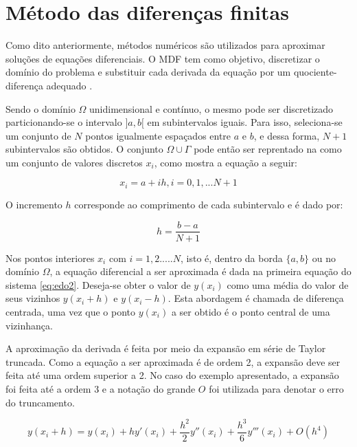 \section{Método das diferenças finitas}

Como dito anteriormente, métodos numéricos são utilizados para aproximar soluções de equações diferenciais. O MDF tem como objetivo, discretizar o domínio do problema e substituir cada derivada da equação por um quociente-diferença adequado
\citep[p. 684]{burden_faires}.


Sendo o domínio $ \Omega $ unidimensional e contínuo, o mesmo pode ser discretizado particionando-se o intervalo $]a, b[$ em subintervalos iguais. Para isso, seleciona-se um conjunto de $N$ pontos igualmente espaçados entre $a$ e $b$, e dessa forma, $ N + 1 $ subintervalos são obtidos. O conjunto $\Omega \cup \Gamma$ pode então ser reprentado na como um conjunto de valores discretos $x_i$, como mostra a equação a seguir: 

\begin{equation}
  x_i = a + ih,  i = 0, 1, ... N+1
\end{equation}

O incremento $h$ corresponde ao comprimento de cada subintervalo e é dado por:

\begin{equation}
  h = \frac{b-a}{N+1}
\end{equation}

Nos pontos interiores $ x_i$  com $i = 1, 2. .... N $, isto é, dentro da borda $ \{a, b\} $ ou no domínio $\Omega$, a equação diferencial a ser aproximada é dada na primeira equação do sistema  \ref{eq:edo2}.
Deseja-se obter o valor de $ y(x_i) $ como uma média do valor de seus vizinhos $ y(x_i + h) $ e $ y(x_i - h) $. Esta abordagem é chamada de diferença centrada, uma vez que o ponto $ y(x_i) $ a ser obtido é o ponto central de uma vizinhança. 

A aproximação da derivada é feita por meio da expansão em série de Taylor truncada. Como a equação a ser aproximada é de ordem 2, a expansão deve ser feita até uma ordem superior a 2. No caso do exemplo apresentado, a expansão foi feita até a ordem 3 e a notação do grande $O$ foi utilizada para denotar o erro do truncamento.

\begin{equation}
    \label{eq:dfr}
    y(x_i + h) = y(x_i) + hy'(x_i) + \frac{h^{2}}{2}y''(x_i) + \frac{h^{3}}{6}y'''(x_i) + O(h^{4})
\end{equation}

